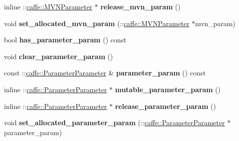 \begin{DoxyCompactItemize}
inline \+::\mbox{\hyperlink{classcaffe_1_1_m_v_n_parameter}{caffe\+::\+M\+V\+N\+Parameter}} $\ast$ {\bfseries release\+\_\+mvn\+\_\+param} ()
\item 
\mbox{\label{classcaffe_1_1_layer_parameter_aa1a619f927db3639e097ae494d103516}} 
void {\bfseries set\+\_\+allocated\+\_\+mvn\+\_\+param} (\+::\mbox{\hyperlink{classcaffe_1_1_m_v_n_parameter}{caffe\+::\+M\+V\+N\+Parameter}} $\ast$mvn\+\_\+param)
\item 
\mbox{\label{classcaffe_1_1_layer_parameter_ad8d8aa28dd5631d8be3275d43c888d14}} 
bool {\bfseries has\+\_\+parameter\+\_\+param} () const
\item 
\mbox{\label{classcaffe_1_1_layer_parameter_a11f3c645acad540f84694322058f2b06}} 
void {\bfseries clear\+\_\+parameter\+\_\+param} ()
\item 
\mbox{\label{classcaffe_1_1_layer_parameter_a03aa890b222abf460c0bf3d526afd4e5}} 
const \+::\mbox{\hyperlink{classcaffe_1_1_parameter_parameter}{caffe\+::\+Parameter\+Parameter}} \& {\bfseries parameter\+\_\+param} () const
\item 
\mbox{\label{classcaffe_1_1_layer_parameter_ace1ed5fa7690773c1855cfa2a8634c01}} 
inline \+::\mbox{\hyperlink{classcaffe_1_1_parameter_parameter}{caffe\+::\+Parameter\+Parameter}} $\ast$ {\bfseries mutable\+\_\+parameter\+\_\+param} ()
\item 
\mbox{\label{classcaffe_1_1_layer_parameter_a5af8b25f929b6dd156b7ff5653d19a59}} 
inline \+::\mbox{\hyperlink{classcaffe_1_1_parameter_parameter}{caffe\+::\+Parameter\+Parameter}} $\ast$ {\bfseries release\+\_\+parameter\+\_\+param} ()
\item 
\mbox{\label{classcaffe_1_1_layer_parameter_a17c5567bc4547f1328013d487483f823}} 
void {\bfseries set\+\_\+allocated\+\_\+parameter\+\_\+param} (\+::\mbox{\hyperlink{classcaffe_1_1_parameter_parameter}{caffe\+::\+Parameter\+Parameter}} $\ast$parameter\+\_\+param)
\item 
\mbox{\label{classcaffe_1_1_layer_parameter_a45dc21c1a05138ff5b27928e2b71ccfa}} 

\end{DoxyCompactItemize}
